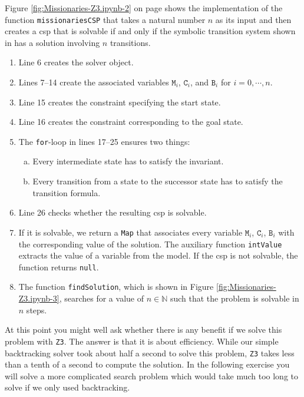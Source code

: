 Figure \ref{fig:Missionaries-Z3.ipynb-2} on page \pageref{fig:Missionaries-Z3.ipynb-2} shows the implementation
of the function \texttt{missionariesCSP} that takes a natural number $n$ as its input and then creates a
\Gls{csp} that is solvable if and only if the symbolic transition system shown in
 has a solution involving $n$ transitions.
\begin{enumerate}
\item Line 6 creates the solver object.
\item Lines 7--14 create the associated variables $\mathtt{M}_i$, $\mathtt{C}_i$, and $\mathtt{B}_i$
      for $i=0, \cdots, n$.
\item Line 15 creates the constraint specifying the start state.    
\item Line 16 creates the constraint corresponding to the goal state.
\item The \texttt{for}-loop in lines 17--25 ensures two things:
  \begin{enumerate}[(a)]
  \item Every intermediate state has to satisfy the invariant.
  \item Every transition from a state to the successor state has to satisfy the transition formula.
  \end{enumerate}
\item Line 26 checks whether the resulting \Gls{csp} is solvable.
\item If it is solvable, we return a \texttt{Map} that associates every variable $\texttt{M}_i$,  $\texttt{C}_i$,
      $\texttt{B}_i$ with the corresponding value of the solution.  The auxiliary function \texttt{intValue}
      extracts the value of a variable from the model.  If the \Gls{csp} is not solvable, the function returns
      \texttt{null}.
\item The function \texttt{findSolution}, which is shown in Figure \ref{fig:Missionaries-Z3.ipynb-3}, searches for
      a value of $n \in \mathbb{N}$ such that the problem is solvable in $n$ steps.
\end{enumerate}
At this point you might well ask whether there is any benefit if we solve this problem with \texttt{Z3}.  The
answer is that it is about efficiency.  While our simple backtracking solver took about half a second to solve this
problem, \texttt{Z3} takes less than a tenth of a second to compute the solution.  In the following exercise you will
solve a more complicated search problem which would take much too long to solve if we only used backtracking.


